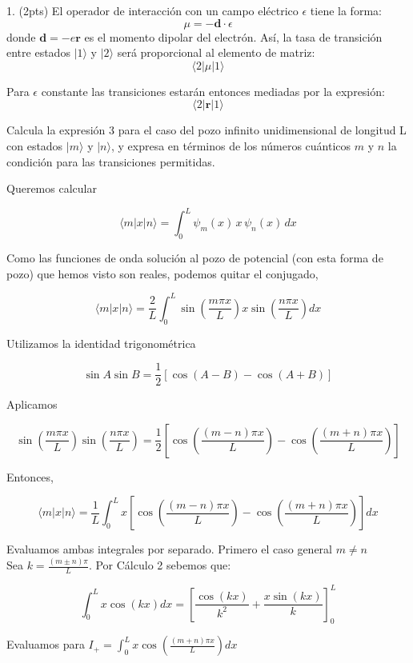 \documentclass{article}
\theoremstyle{nonumberplain}
\begin{document}
1. (2pts) El operador de interacción con un campo eléctrico \( \epsilon \) tiene la forma:
\[
\mu=-\mathbf{d} \cdot \epsilon
\]
donde \( \mathbf{d}=-e \mathbf{r} \) es el momento dipolar del electrón. Así, la tasa de transición entre estados \( |1\rangle \) y \( |2\rangle \) será proporcional al elemento de matriz:
\[
\langle 2| \mu|1\rangle
\]

Para \( \epsilon \) constante las transiciones estarán entonces mediadas por la expresión:
\[
\langle 2| \mathbf{r}|1\rangle
\]

Calcula la expresión 3 para el caso del pozo infinito unidimensional de longitud L con estados \( |m\rangle \) y \( |n\rangle \), y expresa en términos de los números cuánticos \( m \) y \( n \) la condición para las transiciones permitidas.

Queremos calcular

$$
\langle m | x | n \rangle = \int_0^L \psi_m(x) \, x \, \psi_n(x) \, dx
$$

Como las funciones de onda solución al pozo de potencial (con esta forma de pozo) que hemos visto son reales, podemos quitar el conjugado,

$$
\langle m | x | n \rangle = \frac{2}{L} \int_0^L \sin\left(\frac{m \pi x}{L}\right) x \sin\left(\frac{n \pi x}{L}\right) dx
$$

Utilizamos la identidad trigonométrica

$$
\sin A \sin B = \frac{1}{2} [\cos(A - B) - \cos(A + B)]
$$

Aplicamos

$$
\sin\left(\frac{m \pi x}{L}\right) \sin\left(\frac{n \pi x}{L}\right) = \frac{1}{2} \left[ \cos\left( \frac{(m - n)\pi x}{L} \right) - \cos\left( \frac{(m + n)\pi x}{L} \right) \right]
$$

Entonces,

$$
\langle m | x | n \rangle = \frac{1}{L} \int_0^L x \left[ \cos\left( \frac{(m - n)\pi x}{L} \right) - \cos\left( \frac{(m + n)\pi x}{L} \right) \right] dx
$$

Evaluamos ambas integrales por separado. Primero el caso general $m \neq n$ \\

Sea $k = \frac{(m \pm n)\pi}{L}$. Por Cálculo 2 sebemos que:

$$
\int_0^L x \cos(k x) dx = \left[ \frac{\cos(k x)}{k^2} + \frac{x \sin(k x)}{k} \right]_0^L
$$

Evaluamos para $I_{+} = \int_0^L x \cos\left( \frac{(m + n)\pi x}{L} \right) dx$ \\
\end{document}
